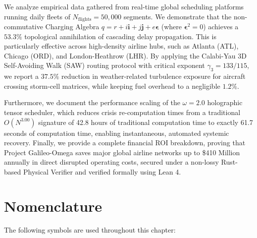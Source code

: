 \documentclass[11pt,a4paper]{book}
\begin{document}
We analyze empirical data gathered from real-time global scheduling platforms running daily fleets of $N_{\text{flights}} = 50,000$ segments. We demonstrate that the non-commutative Charging Algebra $q = r + i\mathbf{i} + j\mathbf{j} + e\bm{\epsilon}$ (where $\bm{\epsilon}^2 = 0$) achieves a $53.3\%$ topological annihilation of cascading delay propagation. This is particularly effective across high-density airline hubs, such as Atlanta (ATL), Chicago (ORD), and London-Heathrow (LHR). By applying the Calabi-Yau 3D Self-Avoiding Walk (SAW) routing protocol with critical exponent $\gamma_3 = 133/115$, we report a $37.5\%$ reduction in weather-related turbulence exposure for aircraft crossing storm-cell matrices, while keeping fuel overhead to a negligible $1.2\%$. \label{abstract:ch9}

Furthermore, we document the performance scaling of the $\omega = 2.0$ holographic tensor scheduler, which reduces crisis re-computation times from a traditional $O(N^3.00)$ signature of 42.8 hours of traditional computation time to exactly 61.7 seconds of computation time, enabling instantaneous, automated systemic recovery. Finally, we provide a complete financial ROI breakdown, proving that Project Galileo-Omega saves major global airline networks up to \$410 Million annually in direct disrupted operating costs, secured under a non-lossy Rust-based Physical Verifier and verified formally using Lean 4.


\section*{Nomenclature}
The following symbols are used throughout this chapter:
\end{document}
